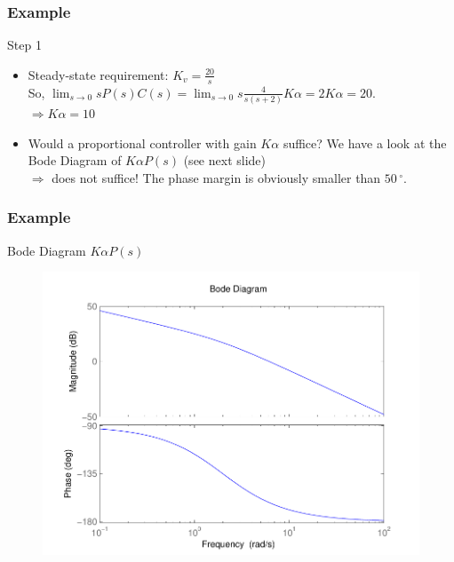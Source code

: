 \begin{frame}
\frametitle{Example}
\begin{block}{Step 1}
\begin{itemize}	
\item Steady-state requirement: $K_v = \frac{20}{s}$ \\
So, $\lim_{s \to 0} sP(s)C(s) = \lim_{s \to 0} s\frac{4}{s(s+2)}K\alpha = 2K\alpha = 20$. \\
$\Rightarrow K\alpha = 10$
\item Would a proportional controller with gain $K\alpha$ suffice? We have a look at the Bode Diagram of $K\alpha P(s)$ (see next slide) \\
$\Rightarrow$ does not suffice! The phase margin is obviously smaller than $50\,^{\circ}$.
\end{itemize}
\end{block}
\end{frame}

\begin{frame}
\frametitle{Example}
\begin{block}{Bode Diagram $K\alpha P(s)$}
	\begin{figure}
		\centering
		\includegraphics[width=0.6
		\linewidth]{bodeleadexamplestep1}
	\end{figure}
\end{block}
\end{frame}

